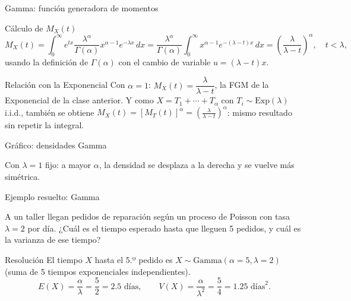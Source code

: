 \documentclass[aspectratio=169,11pt]{beamer}
\begin{document}
\begin{frame}{Gamma: función generadora de momentos}
\begin{block}{Cálculo de $M_X(t)$}
$$M_X(t) = \int_0^\infty e^{tx}\frac{\lambda^\alpha}{\Gamma(\alpha)}x^{\alpha-1}e^{-\lambda x}\,dx = \frac{\lambda^\alpha}{\Gamma(\alpha)}\int_0^\infty x^{\alpha-1}e^{-(\lambda-t)x}\,dx = \left(\frac{\lambda}{\lambda-t}\right)^{\!\alpha}, \quad t<\lambda,$$
usando la definición de $\Gamma(\alpha)$ con el cambio de variable $u=(\lambda-t)x$.
\end{block}

\begin{alertblock}{Relación con la Exponencial}
Con $\alpha=1$: $M_X(t) = \dfrac{\lambda}{\lambda-t}$, la FGM de la Exponencial de la clase anterior. Y como $X=T_1+\cdots+T_\alpha$ con $T_i\sim\text{Exp}(\lambda)$ i.i.d., también se obtiene $M_X(t) = [M_{T}(t)]^\alpha = \left(\frac{\lambda}{\lambda-t}\right)^\alpha$: mismo resultado sin repetir la integral.
\end{alertblock}
\end{frame}

\begin{frame}{Gráfico: densidades Gamma}
\begin{center}
\end{center}
Con $\lambda=1$ fijo: a mayor $\alpha$, la densidad se desplaza a la derecha y se vuelve más simétrica.
\end{frame}

\begin{frame}{Ejemplo resuelto: Gamma}
\begin{example}
A un taller llegan pedidos de reparación según un proceso de Poisson con tasa $\lambda=2$ por día. ¿Cuál es el tiempo esperado hasta que lleguen 5 pedidos, y cuál es la varianza de ese tiempo?
\end{example}

\begin{block}{Resolución}
El tiempo $X$ hasta el 5.º pedido es $X\sim\text{Gamma}(\alpha=5,\lambda=2)$ (suma de 5 tiempos exponenciales independientes).
$$E(X) = \frac{\alpha}{\lambda} = \frac{5}{2} = 2.5 \text{ días}, \qquad V(X) = \frac{\alpha}{\lambda^2} = \frac{5}{4} = 1.25 \text{ días}^2.$$
\end{block}
\end{frame}
\end{document}
